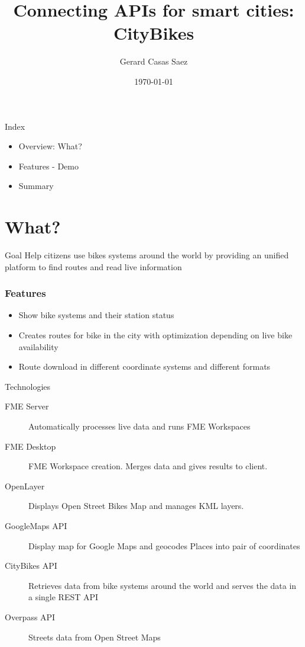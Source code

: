 \documentclass[10pt, compress]{beamer}
\title{Connecting APIs for smart cities: CityBikes}
\subtitle{}
\date{\today}
\author{Gerard Casas Saez}
\institute{Universitat Politècnica de Catalunya}
\begin{document}
\maketitle
\begin{frame}{Index}
\large
    \begin{itemize}
        \item Overview: What?
        \item Features - Demo
        \item Summary
    \end{itemize}
\end{frame}
\section{What?}
\begin{frame}{Goal}
\Large Help \alert{citizens} use bikes systems around the world by providing an \alert{unified platform} to find routes and read live information

\end{frame}

\begin{frame}[fragile]
\frametitle{Features}
    \large
    \begin{itemize}
        \item Show \alert{bike systems} and their station status
        \item Creates  \alert{routes for bike} in the city with optimization depending on live bike availability
        \item \alert{Route download} in different coordinate systems and different formats
  \end{itemize}
\end{frame}

\begin{frame}{Technologies}
    \begin{description}
        \item[FME Server] Automatically processes live data and runs FME Workspaces
        \item[FME Desktop] FME Workspace creation. Merges data and gives results to client.
        \item[OpenLayer] Displays Open Street Bikes Map and manages KML layers.
        \item[GoogleMaps API] Display map for Google Maps and geocodes Places into pair of coordinates
        \item[CityBikes API] Retrieves data from bike systems around the world and serves the data in a single REST API
        \item[Overpass API]  Streets data from Open Street Maps
    \end{description}
\end{frame}
\end{document}
